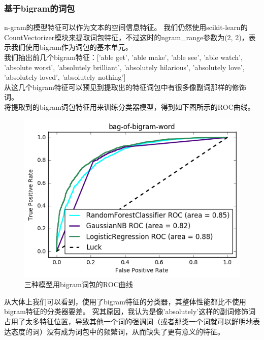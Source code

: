 \subsubsection{基于bigram的词包}
n-gram的模型特征可以作为文本的空间信息特征。
我们仍然使用scikit-learn的CountVectorizer模块来提取词包特征，不过这时的ngram\_range参数为(2, 2)，表示我们使用bigram作为词包的基本单元。\\
我们抽出前几个bigram特征：['able get',
'able make',
'able see',
'able watch',
'absolute worst',
'absolutely brilliant',
'absolutely hilarious',
'absolutely love',
'absolutely loved',
'absolutely nothing'] \\
从这几个bigram特征可以预见到提取出的特征词包中有很多像副词那样的修饰词。\\
将提取到的bigram词包特征用来训练分类器模型，得到如下图所示的ROC曲线。
\begin{figure}[h]
\centering
\includegraphics[width=0.9\linewidth]{3c_roc_bigram}
\caption[3c\_roc\_bigram]{三种模型用bigram词包的ROC曲线}
\label{fig:3crocbigram}
\end{figure}
从大体上我们可以看到，使用了bigram特征的分类器，其整体性能都比不使用bigram特征的分类器要差。
究其原因，我认为是像'absolutely'这样的副词修饰词占用了太多特征位置，导致其他一个词的强调词（或者那类一个词就可以鲜明地表达态度的词）没有成为词包中的频繁词，从而缺失了更有意义的特征。